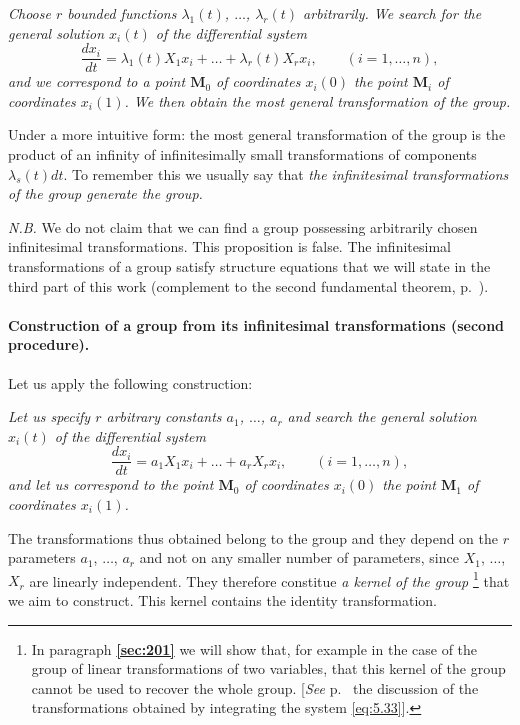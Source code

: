 \documentclass[leqno,11pt]{book}
\numberwithin{equation}{chapter}
\theoremstyle{shape1}
\theoremstyle{shapesmall}
\newcommand{\fsref}[1]{{\rm\textsection\textbf{\ref{sec:#1}}}}
\newcommand{\somespace}{\vspace{9pt}}
\begin{document}
\somespace

\emph{Choose $r$ bounded functions $\lambda_{1}(t)$, $\dots$, $\lambda_{r}(t)$ arbitrarily. We search for the general solution $x_{i}(t)$ of the differential system}
\begin{equation}
  \label{eq:5.32}
  \frac{dx_{i}}{dt}=\lambda_{1}(t)X_{1}x_{i}+\dots+\lambda_{r}(t)X_{r}x_{i},\qquad(i=1,\dots,n),
\end{equation}
\emph{and we correspond to a point $\mathbf{M}_{0}$ of coordinates $x_{i}(0)$ the point $\mathbf{M}_{i}$ of coordinates $x_{i}(1)$. We then obtain the most general transformation of the group.}

\somespace

Under a more intuitive form: the most general transformation of the group is the product of an infinity of infinitesimally small transformations of components $\lambda_{s}(t)dt$. To remember this we usually say that \emph{the infinitesimal transformations of the group generate the group.}

\somespace

\emph{N.B.} We do not claim that we can find a group possessing arbitrarily chosen infinitesimal transformations. This proposition is false. The infinitesimal transformations of a group satisfy structure equations that we will state in the third part of this work (complement to the second fundamental theorem, p.~\pageref{sec:214}).

\paragraph{Construction of a group from its infinitesimal transformations (second procedure).}
\label{sec:86}
Let us apply the following construction:

\somespace

\emph{Let us specify $r$ arbitrary constants $a_{1}$, $\dots$, $a_{r}$ and search the general solution $x_{i}(t)$ of the differential system}
\begin{equation}
  \label{eq:5.33}
  \frac{dx_{i}}{dt}=a_{1}X_{1}x_{i}+\dots+a_{r}X_{r}x_{i},\qquad(i=1,\dots,n),
\end{equation}
\emph{and let us correspond to the point $\mathbf{M}_{0}$ of coordinates $x_{i}(0)$ the point $\mathbf{M}_{1}$ of coordinates $x_{i}(1)$.}

\somespace

The transformations thus obtained belong to the group and they depend on the $r$ parameters $a_{1}$, $\dots$, $a_{r}$ and not on any smaller number of parameters, since $X_{1}$, $\dots$, $X_{r}$ are linearly independent. They therefore constitue \emph{a kernel of the group} \footnote{In paragraph \fsref{201} we will show that, for example in the case of the group of linear transformations of two variables, that this kernel of the group cannot be used to recover the whole group. [\emph{See} p.~\pageref{sec:201} the discussion of the transformations obtained by integrating the system \eqref{eq:5.33}].} that we aim to construct. This kernel contains the identity transformation.
\end{document}

